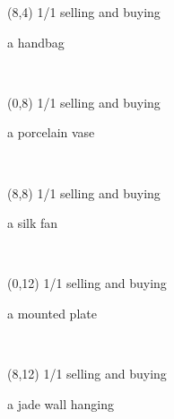\documentclass[a4paper]{article}
\newcommand{\mycard}[5]{%
	\vspace{0.1cm}
	\small #1 #2
	\par
	\parbox[t][6.7cm][c]{9.5cm}{%
	\hspace{0.1cm} \Large#3\\
	\normalsize#4 #5
	}
}
\begin{document}
\begin{textblock}{8}(8,4)
\mycard{1/1}{selling and buying}{\parbox{9.0cm}{
a handbag
}}{}{} 
\end{textblock}

\begin{textblock}{8}(0,8)
\mycard{1/1}{selling and buying}{\parbox{9.0cm}{
a porcelain vase
}}{}{} 
\end{textblock}

\begin{textblock}{8}(8,8)
\mycard{1/1}{selling and buying}{\parbox{9.0cm}{
a silk fan
}}{}{} 
\end{textblock}

\begin{textblock}{8}(0,12)
\mycard{1/1}{selling and buying}{\parbox{9.0cm}{
a mounted plate
}}{}{} 
\end{textblock}

\begin{textblock}{8}(8,12)
\mycard{1/1}{selling and buying}{\parbox{9.0cm}{
a jade wall hanging
}}{}{} 
\end{textblock}
\end{document}
